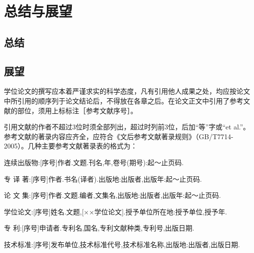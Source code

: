 \chapter{总结与展望}
\section{总结}
\section{展望}

学位论文的撰写应本着严谨求实的科学态度，凡有引用他人成果之处，均应按论文中所引用的顺序列于论文结论后，不得放在各章之后。在论文正文中引用了参考文献的部位，须用上标标注［参考文献序号］。

引用文献的作者不超过3位时须全部列出，超过时列前3位，后加“等”字或“et al.”。参考文献的著录内容应齐全，应符合《文后参考文献著录规则》（GB/T7714-2005）。几种主要参考文献著录表的格式为：

连续出版物:[序号]作者.文题.刊名,年,卷号(期号):起～止页码.

专 译 著:[序号]作者.书名(译者).出版地:出版者,出版年:起～止页码.

论 文 集:[序号]作者.文题.编者,文集名,出版地:出版者,出版年:起～止页码.

学位论文:[序号]姓名.文题,[××学位论文].授予单位所在地:授予单位,授予年.

专    利:[序号]申请者.专利名,国名,专利文献种类,专利号,出版日期.

技术标准:[序号]发布单位,技术标准代号,技术标准名称,出版地:出版者,出版日期.
